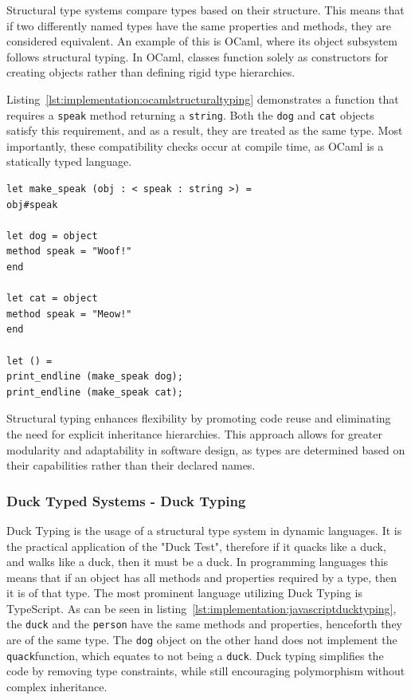 Structural type systems compare types based on their structure. This means that if two differently named types have the same properties and methods, they are considered equivalent. An example of this is OCaml, where its object subsystem follows structural typing. In OCaml, classes function solely as constructors for creating objects rather than defining rigid type hierarchies.

Listing~\ref{lst:implementation:ocamlstructuraltyping} demonstrates a function that requires a \lstinline|speak| method returning a \lstinline|string|. Both the \lstinline|dog| and \lstinline|cat| objects satisfy this requirement, and as a result, they are treated as the same type. Most importantly, these compatibility checks occur at compile time, as OCaml is a statically typed language.

\begin{lstlisting}[language=caml,caption=Example of structural typing in Ocaml,label=lst:implementation:ocamlstructuraltyping]
let make_speak (obj : < speak : string >) =
obj#speak

let dog = object
method speak = "Woof!"
end

let cat = object
method speak = "Meow!"
end

let () =
print_endline (make_speak dog);
print_endline (make_speak cat);
\end{lstlisting}

Structural typing enhances flexibility by promoting code reuse and eliminating the need for explicit inheritance hierarchies. This approach allows for greater modularity and adaptability in software design, as types are determined based on their capabilities rather than their declared names.

\subsubsection{Duck Typed Systems - Duck Typing}

Duck Typing is the usage of a structural type system in dynamic languages. It is the practical application of the "Duck Test", therefore if it quacks like a duck, and walks like a duck, then it must be a duck. In programming languages this means that if an object has all methods and properties required by a type, then it is of that type. The most prominent language utilizing Duck Typing is TypeScript. As can be seen in listing~\ref{lst:implementation:javascriptducktyping}, the \lstinline|duck| and the \lstinline|person| have the same methods and properties, henceforth they are of the same type. The \lstinline|dog| object on the other hand does not implement the \lstinline|quack|function, which equates to not being a \lstinline|duck|. Duck typing simplifies the code by removing type constraints, while still encouraging polymorphism without complex inheritance.

